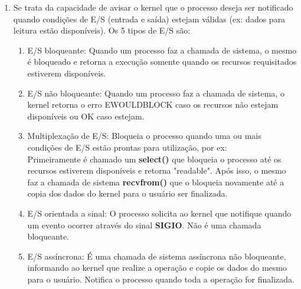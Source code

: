 \documentclass[12pt,a4paper]{report}
\begin{document}
\begin{enumerate}
    \item Se trata da capacidade de avisar o kernel que o processo deseja ser notificado quando condições de E/S (entrada e saída) estejam válidas (ex: dados para leitura estão disponíveis). Os 5 tipos de E/S são:
    \begin{enumerate}
        \item E/S bloqueante: Quando um processo faz a chamada de sistema, o mesmo é bloqueado e retorna a execução somente quando os recursos requisitados estiverem disponíveis.
        
        \item E/S não bloqueante: Quando um processo faz a chamada de sistema, o kernel retorna o erro EWOULDBLOCK caso os recursos não estejam disponíveis ou OK caso estejam.
        
        \item Multiplexação de E/S: Bloqueia o processo quando uma ou mais condições de E/S estão prontas para utilização, por ex: \\
        Primeiramente é chamado um \textbf{select()} que bloqueia o processo até os recursos estiverem disponíveis e retorna "readable". Após isso, o mesmo faz a chamada de sistema \textbf{recvfrom()} que o bloqueia novamente até a copia dos dados do kernel para o usuário ser finalizada.
        
        \item E/S orientada a sinal: O processo solicita ao kernel que notifique quando um evento ocorrer através do sinal \textbf{SIGIO}. Não é uma chamada bloqueante.
        
        \item E/S assíncrona: É uma chamada de sistema assíncrona não bloqueante, informando ao kernel que realize a operação e copie os dados do mesmo para o usuário. Notifica o processo quando toda a operação for finalizada.
    \end{enumerate}
    

\end{enumerate}
\end{document}
